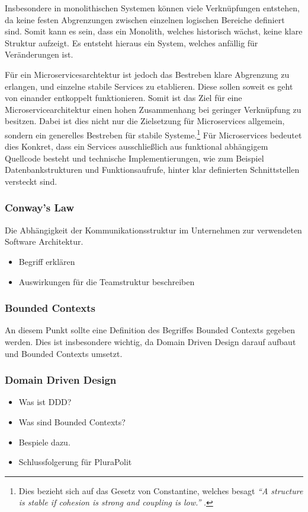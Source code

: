 Insbesondere in monolithischen Systemen können viele Verknüpfungen entstehen, da keine festen Abgrenzungen zwischen einzelnen logischen Bereiche definiert sind. Somit kann es sein, dass ein Monolith, welches historisch wächst, keine klare Struktur aufzeigt. Es entsteht hieraus ein System, welches anfällig für Veränderungen ist.

Für ein Microservicesarchtektur ist jedoch das Bestreben klare Abgrenzung zu erlangen, und einzelne stabile Services zu etablieren. Diese sollen soweit es geht von einander entkoppelt funktionieren. Somit ist das Ziel für eine Microservicearchitektur einen hohen Zusammenhang bei geringer Verknüpfung zu besitzen. Dabei ist dies nicht nur die Zielsetzung für Microservices allgemein, sondern ein generelles Bestreben für stabile Systeme.\footnote{Dies bezieht sich auf das Gesetz von Constantine, welches besagt \textit{\enquote{A structure is stable if cohesion is strong and coupling is low.}} \parencite[S. 43]{endres_handbook_2003}.} Für Microservices bedeutet dies Konkret, dass ein Services ausschließlich aus funktional abhängigem Quellcode besteht und technische Implementierungen, wie zum Beispiel Datenbankstrukturen und Funktionsaufrufe, hinter klar definierten Schnittstellen versteckt sind.

\subsubsection{Conway's Law}

Die Abhängigkeit der Kommunikationsstruktur im Unternehmen zur verwendeten Software Architektur.

\begin{itemize}
	\item Begriff erklären
	\item Auswirkungen für die Teamstruktur beschreiben
\end{itemize}

\subsubsection{Bounded Contexts}

An diesem Punkt sollte eine Definition des Begriffes Bounded Contexts gegeben werden. Dies ist insbesondere wichtig, da Domain Driven Design darauf aufbaut und Bounded Contexts umsetzt.

\subsubsection{Domain Driven Design}

\begin{itemize}
	\item Was ist DDD?
	\item Was sind Bounded Contexts?
	\item 	Bespiele dazu.
	\item Schlussfolgerung für PluraPolit
\end{itemize}
